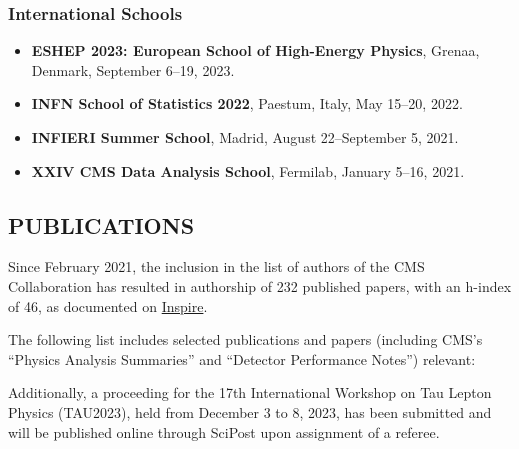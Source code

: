 \documentclass[12pt,a4paper,oneside]{extarticle}
\begin{document}
\subsubsection*{International Schools}
\begin{itemize}
    \item \textbf{ESHEP 2023: European School of High-Energy Physics}, Grenaa, Denmark, September 6–19, 2023.
    \item \textbf{INFN School of Statistics 2022}, Paestum, Italy, May 15–20, 2022.
    \item \textbf{INFIERI Summer School}, Madrid, August 22–September 5, 2021.
    \item \textbf{XXIV CMS Data Analysis School}, Fermilab, January 5–16, 2021.
\end{itemize}

\subsection*{PUBLICATIONS}
Since February 2021, the inclusion in the list of authors of the CMS Collaboration has resulted in authorship of 232 published papers, with an h-index of 46, as documented on \href{https://inspirehep.net/authors/1821915}{Inspire}.

The following list includes selected publications and papers (including CMS's ``Physics Analysis Summaries'' and ``Detector Performance Notes'') relevant:
\vspace{-1.5cm}

%
% 

\nocite{bbttpaper}
\nocite{CMS-PAS-HIG-20-010}
\nocite{DAmante:2022xmb}
\nocite{CMS-DP-2023-024}

Additionally, a proceeding for the 17th International Workshop on Tau Lepton Physics (TAU2023), held from December 3 to 8, 2023, has been submitted and will be published online through SciPost upon assignment of a referee.\\

\end{document}
